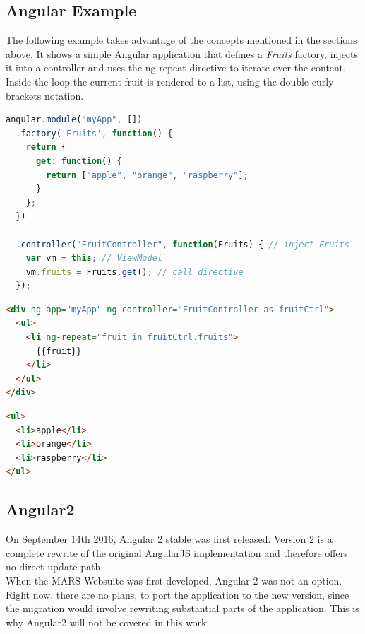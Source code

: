 \subsection{Angular Example}
The following example takes advantage of the concepts mentioned in the sections above. It shows a simple Angular application that defines a \textit{Fruits} factory, injects it into a controller and uses the ng-repeat directive to iterate over the content. Inside the loop the current fruit is rendered to a list, using the double curly brackets notation.

\begin{lstlisting}[language=javascript, caption=AngularJS directive and controller definition, label=lst:angular]
angular.module("myApp", [])
  .factory('Fruits', function() {
    return {
      get: function() {
        return ["apple", "orange", "raspberry"];
      }
    };
  })
  
  .controller("FruitController", function(Fruits) { // inject Fruits
    var vm = this; // ViewModel
    vm.fruits = Fruits.get(); // call directive
  });
\end{lstlisting}

\begin{lstlisting}[language=html, caption=AngularJS template]
<div ng-app="myApp" ng-controller="FruitController as fruitCtrl">
  <ul>
    <li ng-repeat="fruit in fruitCtrl.fruits">
      {{fruit}}
    </li>
  </ul>
</div>
\end{lstlisting}

\begin{lstlisting}[language=html, caption=HTML result]
<ul>
  <li>apple</li>
  <li>orange</li>
  <li>raspberry</li>
</ul>
\end{lstlisting}


\subsection{Angular2}
On September 14th 2016, Angular 2 stable was first released. Version 2 is a complete rewrite of the original AngularJS implementation and therefore offers no direct update path.\\
When the MARS Websuite was first developed, Angular 2 was not an option. Right now, there are no plans, to port the application to the new version, since the migration would involve rewriting substantial parts of the application. This is why Angular2 will not be covered in this work.

